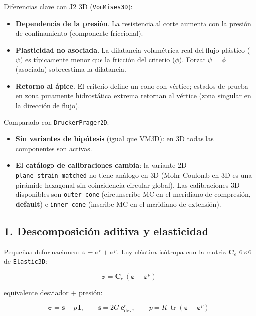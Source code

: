 \documentclass[11pt,letterpaper,oneside]{report}
\begin{document}
Diferencias clave con J2 3D (\texttt{VonMises3D}):

\begin{itemize}
  \item \textbf{Dependencia de la presión}. La resistencia al corte aumenta con la presión de confinamiento (componente friccional).
  \item \textbf{Plasticidad no asociada}. La dilatancia volumétrica real del flujo plástico ($\psi$) es típicamente menor que la fricción del criterio ($\phi$). Forzar $\psi = \phi$ (asociada) sobreestima la dilatancia.
  \item \textbf{Retorno al ápice}. El criterio define un cono con vértice; estados de prueba en zona puramente hidrostática extrema retornan al vértice (zona singular en la dirección de flujo).
\end{itemize}

Comparado con \texttt{DruckerPrager2D}:

\begin{itemize}
  \item \textbf{Sin variantes de hipótesis} (igual que VM3D): en 3D todas las componentes son activas.
  \item \textbf{El catálogo de calibraciones cambia}: la variante 2D \texttt{plane\_strain\_matched} no tiene análogo en 3D (Mohr-Coulomb en 3D es una pirámide hexagonal sin coincidencia circular global). Las calibraciones 3D disponibles son \texttt{outer\_cone} (circunscribe MC en el meridiano de compresión, \textbf{default}) e \texttt{inner\_cone} (inscribe MC en el meridiano de extensión).
\end{itemize}

\subsection{1. Descomposición aditiva y elasticidad}

Pequeñas deformaciones: $\boldsymbol\varepsilon = \boldsymbol\varepsilon^e + \boldsymbol\varepsilon^p$. Ley elástica isótropa con la matriz $\mathbf C_e$ 6\ensuremath{\times}6 de \texttt{Elastic3D}:

\[
\boldsymbol\sigma = \mathbf C_e\,(\boldsymbol\varepsilon - \boldsymbol\varepsilon^p)
\]

equivalente desviador + presión:

\[
\boldsymbol\sigma = \mathbf s + p\,\mathbf I, \qquad \mathbf s = 2G\,\mathbf e^e_\text{dev}, \qquad p = K\,\operatorname{tr}(\boldsymbol\varepsilon - \boldsymbol\varepsilon^p)
\]
\end{document}
